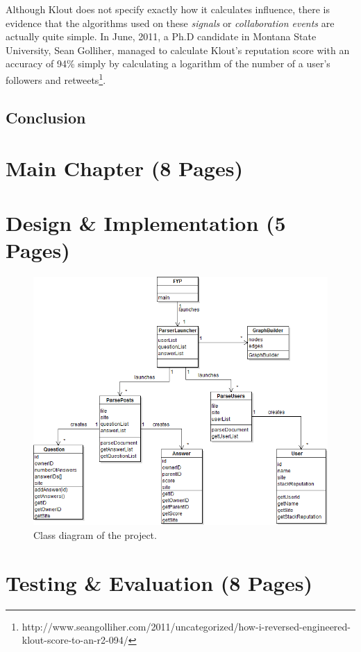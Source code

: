 \documentclass[]{final_report}
\begin{document}
Although Klout does not specify exactly how it calculates influence, there is evidence that the algorithms used on these \textsl{signals} or \textsl{collaboration events} are actually quite simple. In June, 2011, a Ph.D candidate in Montana State University, Sean Golliher, managed to calculate Klout's reputation score with an accuracy of 94\% simply by calculating a logarithm of the number of a user's followers and retweets\footnote{http://www.seangolliher.com/2011/uncategorized/how-i-reversed-engineered-klout-score-to-an-r2-094/}.

\section{Conclusion}

\chapter{Main Chapter (8 Pages)}

\chapter{Design \& Implementation (5 Pages)}

\begin{figure}[ht!]
\centering
\includegraphics[width=140mm]{classdiagram.png}
\caption{Class diagram of the project.}
\end{figure}

\chapter{Testing \& Evaluation (8 Pages)}
\end{document}
